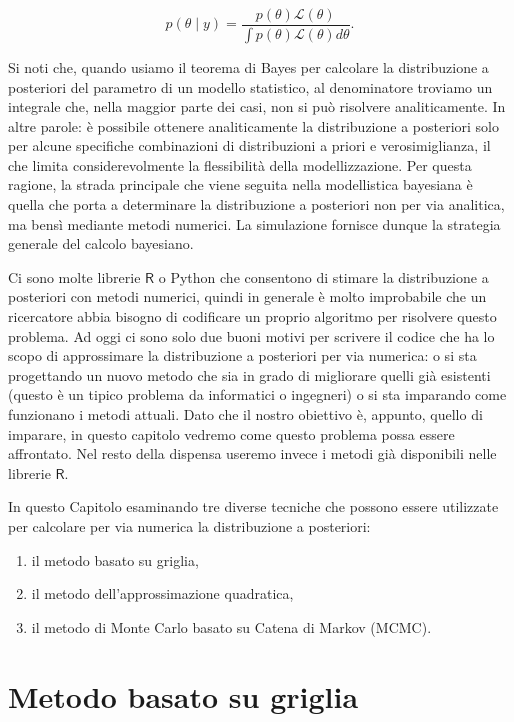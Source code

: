 \documentclass[
  11pt,
]{krantz}
\providecommand{\tightlist}{%
  \setlength{\itemsep}{0pt}\setlength{\parskip}{0pt}}
\newcommand{\R}{\textsf{R}} %
\theoremstyle{definition}
\theoremstyle{definition}
\theoremstyle{definition}
\theoremstyle{definition}
\theoremstyle{remark}
\begin{document}
\begin{equation}
p(\theta \mid y) = \frac{p(\theta) \mathcal{L}(\theta)}{\int p(\theta) \mathcal{L}(\theta) d \theta}.
\end{equation}

Si noti che, quando usiamo il teorema di Bayes per calcolare la distribuzione a posteriori del parametro di un modello statistico, al denominatore troviamo un integrale che, nella maggior parte dei casi, non si può risolvere analiticamente. In altre parole: è possibile ottenere analiticamente la distribuzione a posteriori solo per alcune specifiche combinazioni di distribuzioni a priori e verosimiglianza, il che limita considerevolmente la flessibilità della modellizzazione. Per questa ragione, la strada principale che viene seguita nella modellistica bayesiana è quella che porta a determinare la distribuzione a posteriori non per via analitica, ma bensì mediante metodi numerici. La simulazione fornisce dunque la strategia generale del calcolo bayesiano.

Ci sono molte librerie \(\R\) o Python che consentono di stimare la distribuzione a posteriori con metodi numerici, quindi in generale è molto improbabile che un ricercatore abbia bisogno di codificare un proprio algoritmo per risolvere questo problema. Ad oggi ci sono solo due buoni motivi per scrivere il codice che ha lo scopo di approssimare la distribuzione a posteriori per via numerica: o si sta progettando un nuovo metodo che sia in grado di migliorare quelli già esistenti (questo è un tipico problema da informatici o ingegneri) o si sta imparando come funzionano i metodi attuali. Dato che il nostro obiettivo è, appunto, quello di imparare, in questo capitolo vedremo come questo problema possa essere affrontato. Nel resto della dispensa useremo invece i metodi già disponibili nelle librerie \(\R\).

In questo Capitolo esaminando tre diverse tecniche che possono essere utilizzate per calcolare per via numerica la distribuzione a posteriori:

\begin{enumerate}
\def\labelenumi{\arabic{enumi}.}
\tightlist
\item
  il metodo basato su griglia,
\item
  il metodo dell'approssimazione quadratica,
\item
  il metodo di Monte Carlo basato su Catena di Markov (MCMC).
\end{enumerate}

\hypertarget{metodo-basato-su-griglia}{%
\section{Metodo basato su griglia}\label{metodo-basato-su-griglia}}
\end{document}
